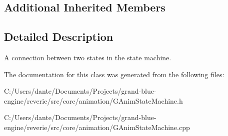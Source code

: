 \subsection*{Additional Inherited Members}


\subsection{Detailed Description}
A connection between two states in the state machine. 

The documentation for this class was generated from the following files\+:\begin{DoxyCompactItemize}
\item 
C\+:/\+Users/dante/\+Documents/\+Projects/grand-\/blue-\/engine/reverie/src/core/animation/G\+Anim\+State\+Machine.\+h\item 
C\+:/\+Users/dante/\+Documents/\+Projects/grand-\/blue-\/engine/reverie/src/core/animation/G\+Anim\+State\+Machine.\+cpp\end{DoxyCompactItemize}

